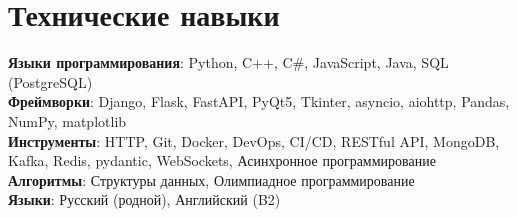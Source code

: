 \documentclass[letterpaper,11pt]{article}
\begin{document}
\section{Технические навыки}
 \begin{itemize}[leftmargin=0.15in, label={}]
    \small{\item{
     \textbf{Языки программирования}{: Python, C++, C\#, JavaScript, Java, SQL (PostgreSQL)} \\
     \textbf{Фреймворки}{: Django, Flask, FastAPI, PyQt5, Tkinter, asyncio, aiohttp, Pandas, NumPy, matplotlib} \\
     \textbf{Инструменты}{: HTTP, Git, Docker, DevOps, CI/CD, RESTful API, MongoDB, Kafka, Redis, pydantic, WebSockets, Асинхронное программирование} \\
     \textbf{Алгоритмы}{: Структуры данных, Олимпиадное программирование} \\
     \textbf{Языки}{: Русский (родной), Английский (B2)}
    }}
 \end{itemize}
\end{document}
